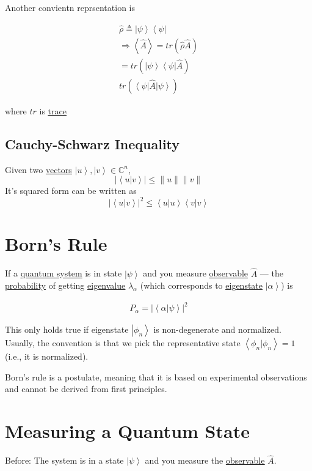 \documentclass[
]{article}
\let\oldhyperref\hyperref
\renewcommand{\hyperref}[2][]{\oldhyperref[#1]{\underline{#2}}}
\providecommand{\ket}[1]{\left\lvert #1 \right\rangle}
\providecommand{\bra}[1]{\left\langle #1 \right\rvert}
\providecommand{\braket}[1]{\left\langle #1 \right\rangle}
\providecommand{\Rarr}{\Rightarrow}
\begin{document}
Another convientn reprsentation is

\begin{gather*}
	\hat{\rho}\triangleq\ket{\psi}\bra{\psi}\\
	\Rarr \braket{\hat{A}}=tr(\hat{\rho}\hat{A})\\
	=tr(\ket{\psi}\bra{\psi}\hat{A})\\
	tr(\bra{\psi}\hat{A}\ket{\psi})
\end{gather*}

where \(tr\) is \hyperref[traces]{trace}
\subsection{Cauchy-Schwarz Inequality}\label{cauchy-schwarz-inequality}
Given two \hyperref[vectors]{vectors} \(\ket{u},\ket{v}\in \mathbb{C}^n\),
\[
	|\braket{u|v}|\leq \|u\|\|v\|
\]
It's squared form can be written as
\[
	|\braket{u|v}|^2\leq \braket{u|u}\braket{v|v}
\]

\section{Born's Rule}\label{borns-rule}

If a \hyperref[quantum-system]{quantum system} is in state \(\ket{\psi}\) and you measure
\hyperref[observables]{observable} \(\hat{A}\) --- the \hyperref[probability-theory]{probability} of getting \hyperref[eigenvectorseigenvalues]{eigenvalue}
\(\lambda_\alpha\) (which corresponds to \hyperref[eigenstates]{eigenstate} \(\ket{\alpha}\)) is

\begin{gather*}
	P_\alpha=|\braket{\alpha|\psi}|^2
\end{gather*}

This only holds true if eigenstate \(\ket{\phi_n}\) is non-degenerate and normalized.
Usually, the convention is that we pick the representative state \(\braket{\phi_n|\phi_n}=1\) (i.e., it is normalized).


Born's rule is a postulate, meaning that it is based on experimental observations and cannot be derived from first principles.

\section{Measuring a Quantum State}\label{measuring-a-quantum-state}
Before:
The system is in a state \(\ket{\psi}\) and you measure the \hyperref[observables]{observable} \(\hat{A}\).
\end{document}
